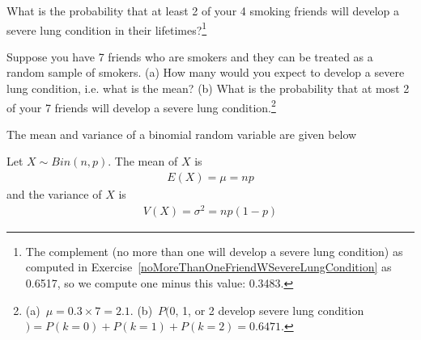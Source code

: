 \begin{exercise}
What is the probability that at least 2 of your 4 smoking friends will develop a severe lung condition in their lifetimes?\footnote{The complement (no more than one will develop a severe lung condition) as computed in Exercise~\ref{noMoreThanOneFriendWSevereLungCondition} as 0.6517, so we compute one minus this value: 0.3483.}
\end{exercise}

\begin{exercise}
Suppose you have 7 friends who are smokers and they can be treated as a random sample of smokers. (a) How many would you expect to develop a severe lung condition, i.e. what is the mean? (b) What is the probability that at most 2 of your 7 friends will develop a severe lung condition.\footnote{(a)~$\mu=0.3\times7 = 2.1$. (b)~$P($0, 1, or 2 develop severe lung condition$) = P(k=0) + P(k=1)+P(k=2) = 0.6471$.}
\end{exercise}


The mean and variance of a binomial random variable are given below

\begin{termBox}{
Let $X \sim Bin(n,p)$.
The mean of $X$ is
\begin{align}
E(X) = \mu = np	\label{meanBinomial}
\end{align}
and the variance of $X$ is
\begin{align}
V(X) = \sigma^{2} = np(1-p)	\label{varianceBinomial}
\end{align}
}
\end{termBox}








